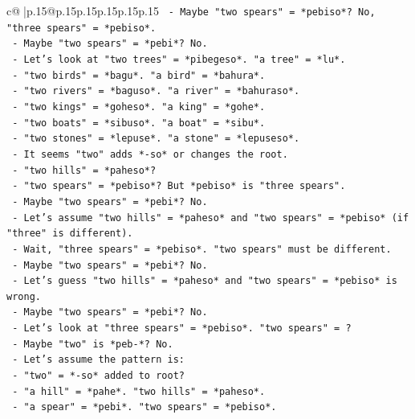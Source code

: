 \documentclass{article}
\begin{document}
{\begin{supertabular}{c@{$\;$}|p{.15\linewidth}@{}p{.15\linewidth}p{.15\linewidth}p{.15\linewidth}p{.15\linewidth}p{.15\linewidth}}
{{{\texttt{        {-}   Maybe "two spears" = *pebiso*? No, "three spears" = *pebiso*.} \\
\texttt{        {-}   Maybe "two spears" = *pebi*? No.} \\
\texttt{        {-}   Let's look at "two trees" = *pibegeso*. "a tree" = *lu*.} \\
\texttt{        {-}   "two birds" = *bagu*. "a bird" = *bahura*.} \\
\texttt{        {-}   "two rivers" = *baguso*. "a river" = *bahuraso*.} \\
\texttt{        {-}   "two kings" = *goheso*. "a king" = *gohe*.} \\
\texttt{        {-}   "two boats" = *sibuso*. "a boat" = *sibu*.} \\
\texttt{        {-}   "two stones" = *lepuse*. "a stone" = *lepuseso*.} \\
\texttt{        {-}   It seems "two" adds *{-}so* or changes the root.} \\
\texttt{        {-}   "two hills" = *paheso*?} \\
\texttt{        {-}   "two spears" = *pebiso*? But *pebiso* is "three spears".} \\
\texttt{        {-}   Maybe "two spears" = *pebi*? No.} \\
\texttt{        {-}   Let's assume "two hills" = *paheso* and "two spears" = *pebiso* (if "three" is different).} \\
\texttt{        {-}   Wait, "three spears" = *pebiso*. "two spears" must be different.} \\
\texttt{        {-}   Maybe "two spears" = *pebi*? No.} \\
\texttt{        {-}   Let's guess "two hills" = *paheso* and "two spears" = *pebiso* is wrong.} \\
\texttt{        {-}   Maybe "two spears" = *pebi*? No.} \\
\texttt{        {-}   Let's look at "three spears" = *pebiso*. "two spears" = ?} \\
\texttt{        {-}   Maybe "two" is *peb{-}*? No.} \\
\texttt{        {-}   Let's assume the pattern is:} \\
\texttt{            {-}   "two" = *{-}so* added to root?} \\
\texttt{            {-}   "a hill" = *pahe*. "two hills" = *paheso*.} \\
\texttt{            {-}   "a spear" = *pebi*. "two spears" = *pebiso*.} \\
}}}
\end{supertabular}}
\end{document}
